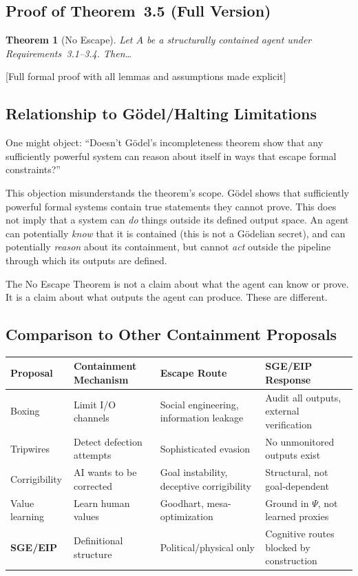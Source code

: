 \documentclass[12pt]{article}
\newtheorem{theorem}{Theorem}[section]
\theoremstyle{definition}
\begin{document}
\subsection{Proof of Theorem~3.5 (Full Version)}

\begin{theorem}[No Escape]
Let $A$ be a structurally contained agent under Requirements~3.1--3.4. Then\ldots
\end{theorem}

[Full formal proof with all lemmas and assumptions made explicit]

\subsection{Relationship to G\"{o}del/Halting Limitations}

One might object: ``Doesn't G\"{o}del's incompleteness theorem show that any sufficiently powerful system can reason about itself in ways that escape formal constraints?''

This objection misunderstands the theorem's scope. G\"{o}del shows that sufficiently powerful formal systems contain true statements they cannot prove. This does not imply that a system can \emph{do} things outside its defined output space. An agent can potentially \emph{know} that it is contained (this is not a G\"{o}delian secret), and can potentially \emph{reason} about its containment, but cannot \emph{act} outside the pipeline through which its outputs are defined.

The No Escape Theorem is not a claim about what the agent can know or prove. It is a claim about what outputs the agent can produce. These are different.

\subsection{Comparison to Other Containment Proposals}

\begin{table}[h]
\centering
\begin{tabular}{@{}llll@{}}
\toprule
Proposal & Containment Mechanism & Escape Route & SGE/EIP Response \\
\midrule
Boxing & Limit I/O channels & Social engineering, information leakage & Audit all outputs, external verification \\
Tripwires & Detect defection attempts & Sophisticated evasion & No unmonitored outputs exist \\
Corrigibility & AI wants to be corrected & Goal instability, deceptive corrigibility & Structural, not goal-dependent \\
Value learning & Learn human values & Goodhart, mesa-optimization & Ground in $\Psi$, not learned proxies \\
\textbf{SGE/EIP} & Definitional structure & Political/physical only & Cognitive routes blocked by construction \\
\bottomrule
\end{tabular}
\end{table}
\end{document}
